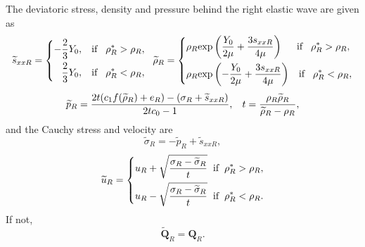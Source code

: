 \documentclass[review]{elsarticle}
\begin{document}
\begin{enumerate}
\begin{enumerate}
                           The deviatoric stress, density and pressure  behind the right elastic  wave are given as
\begin{equation*}
  \widetilde{s}_{xxR} =\left\{ \begin{aligned}
      -\frac{2}{3}Y_0, \hspace{0.3cm} \text{if} \hspace{0.3cm} \rho_R^* > \rho_R,\\
      \frac{2}{3}Y_0, \hspace{0.3cm} \text{if} \hspace{0.3cm} \rho_R^* < \rho_R,\\
    \end{aligned}\right.
    \hspace{0.2cm} \widetilde{\rho}_{R} = \left\{ \begin{aligned}
      & \rho_R \text{exp}\left(\frac{Y_0}{2\mu}+\frac{3 s_{xxR}}{4\mu}\right)  \hspace{0.5cm} \text{if} \hspace{0.3cm} \rho_R^* > \rho_R,\\
& \rho_R \text{exp}\left(-\frac{Y_0}{2\mu}+\frac{3 s_{xxR}}{4\mu}\right)
\hspace{0.3cm} \text{if} \hspace{0.3cm} \rho_R^* < \rho_R,\\
  \end{aligned}\right.
 \end{equation*}
\begin{equation*}
  \widetilde{p}_R= \frac{2t(c_1f(\widetilde{\rho}_R)+e_R)-(\sigma_R+\widetilde{s}_{xxR})}{2tc_0-1}, \hspace{0.3cm}
t=\frac{\rho_R \widetilde{\rho}_R}{\widetilde{\rho}_R-\rho_R},
\end{equation*}
and the Cauchy stress and velocity are
\begin{equation*}
\widetilde{\sigma}_R = -\widetilde{p}_R+\widetilde{s}_{xxR},
\end{equation*}
\begin{equation*}
  \widetilde{u}_R= \left\{
  \begin{aligned}
    u_R+\sqrt{\frac{\sigma_R-\widetilde{\sigma}_R}{t}} \hspace{0.2cm} \text{if} \hspace{0.2cm} \rho_R^* >\rho_R,\\
    u_R-\sqrt{\frac{\sigma_R-\widetilde{\sigma}_R}{t}} \hspace{0.2cm} \text{if} \hspace{0.2cm} \rho_R^* <\rho_R.\\
\end{aligned} \right.
\end{equation*}
If not,
\begin{equation*}
  \widetilde{\mathbf{Q}}_R = \mathbf{Q}_R.
\end{equation*}


\end{enumerate}
\end{enumerate}
\end{document}
